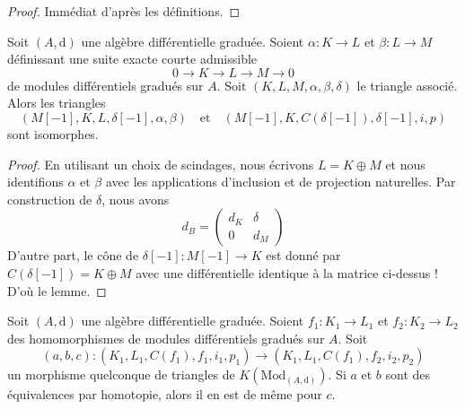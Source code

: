 \begin{proof}
Immédiat d'après les définitions.
\end{proof}

\begin{lemma}
\label{lemma-rotate-triangle}
Soit $(A, \text{d})$ une algèbre différentielle graduée.
Soient $\alpha : K \to L$ et $\beta : L \to M$
définissant une suite exacte courte admissible
$$
0 \to K \to L \to M \to 0
$$
de modules différentiels gradués
sur $A$. Soit $(K, L, M, \alpha, \beta,
\delta)$ le triangle associé. Alors les triangles
$$
(M[-1], K, L, \delta[-1], \alpha, \beta)
\quad\text{et}\quad
(M[-1], K, C(\delta[-1]), \delta[-1], i, p)
$$
sont isomorphes.
\end{lemma}

\begin{proof}
En utilisant un choix de scindages, nous écrivons $L = K \oplus M$ et nous
identifions $\alpha$ et $\beta$ avec les applications d'inclusion et de projection
naturelles. Par construction de $\delta$, nous avons
$$
d_B =
\left(
\begin{matrix}
d_K & \delta \\
0 & d_M
\end{matrix}
\right)
$$
D'autre part, le cône de $\delta[-1] : M[-1] \to K$ est
donné par $C(\delta[-1]) = K \oplus M$ avec une différentielle identique
à la matrice ci-dessus ! D'où le lemme.
\end{proof}

\begin{lemma}
\label{lemma-third-isomorphism}
Soit $(A, \text{d})$ une algèbre différentielle graduée.
Soient $f_1 : K_1 \to L_1$ et $f_2 : K_2 \to L_2$ des homomorphismes de
modules différentiels gradués sur $A$. Soit
$$
(a, b, c) :
(K_1, L_1, C(f_1), f_1, i_1, p_1)
\longrightarrow
(K_1, L_1, C(f_1), f_2, i_2, p_2)
$$
un morphisme quelconque de triangles de $K(\text{Mod}_{(A, \text{d})})$. Si $a$ et
$b$ sont des équivalences par homotopie, alors il en est de même pour $c$.
\end{lemma}

